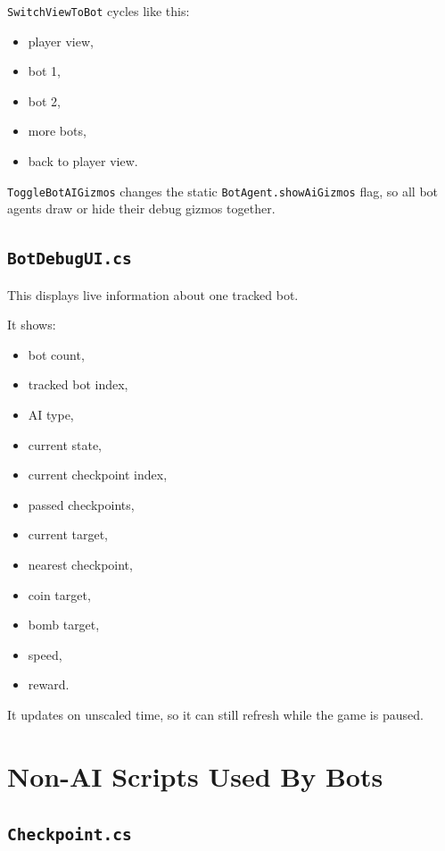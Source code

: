 \documentclass[11pt]{article}
\newcommand{\file}[1]{\texttt{#1}}
\newcommand{\code}[1]{{\footnotesize\texttt{#1}}}
\begin{document}
\code{SwitchViewToBot} cycles like this:

\begin{itemize}
    \item player view,
    \item bot 1,
    \item bot 2,
    \item more bots,
    \item back to player view.
\end{itemize}

\code{ToggleBotAIGizmos} changes the static \code{BotAgent.showAiGizmos} flag, so all bot agents draw or hide their debug gizmos together.

\subsection{\file{BotDebugUI.cs}}

This displays live information about one tracked bot.

It shows:

\begin{itemize}
    \item bot count,
    \item tracked bot index,
    \item AI type,
    \item current state,
    \item current checkpoint index,
    \item passed checkpoints,
    \item current target,
    \item nearest checkpoint,
    \item coin target,
    \item bomb target,
    \item speed,
    \item reward.
\end{itemize}

It updates on unscaled time, so it can still refresh while the game is paused.

\section{Non-AI Scripts Used By Bots}

\subsection{\file{Checkpoint.cs}}
\end{document}
